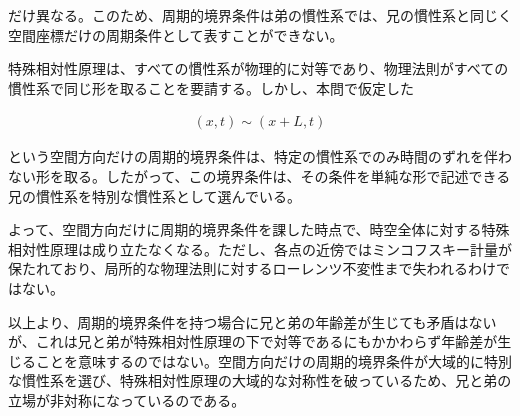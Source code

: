 \documentclass[platex,dvipdfmx,a4paper]{jsarticle}
\begin{document}
だけ異なる。このため、周期的境界条件は弟の慣性系では、兄の慣性系と同じく空間座標だけの周期条件として表すことができない。

特殊相対性原理は、すべての慣性系が物理的に対等であり、物理法則がすべての慣性系で同じ形を取ることを要請する。しかし、本問で仮定した

\begin{align*}
  (x,t)\sim(x+L,t)
\end{align*}

という空間方向だけの周期的境界条件は、特定の慣性系でのみ時間のずれを伴わない形を取る。したがって、この境界条件は、その条件を単純な形で記述できる兄の慣性系を特別な慣性系として選んでいる。

よって、空間方向だけに周期的境界条件を課した時点で、時空全体に対する特殊相対性原理は成り立たなくなる。ただし、各点の近傍ではミンコフスキー計量が保たれており、局所的な物理法則に対するローレンツ不変性まで失われるわけではない。

以上より、周期的境界条件を持つ場合に兄と弟の年齢差が生じても矛盾はないが、これは兄と弟が特殊相対性原理の下で対等であるにもかかわらず年齢差が生じることを意味するのではない。空間方向だけの周期的境界条件が大域的に特別な慣性系を選び、特殊相対性原理の大域的な対称性を破っているため、兄と弟の立場が非対称になっているのである。
\end{document}
